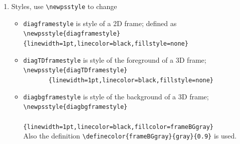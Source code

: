 \documentclass[12pt]{article}
\begin{document}
\begin{enumerate}
\begin{itemize}
       (default 1.5cm) see 
   \end{itemize}
\item Styles, use \verb+\newpsstyle+ to change
   \begin{itemize}
     \item \verb+diagframestyle+  
       is style of a 2D frame; defined as\\
       \verb+\newpsstyle{diagframestyle}{linewidth=1pt,linecolor=black,fillstyle=none}+
     \item \verb+diagTDframestyle+  
       is style of the foreground of a 3D frame;\\
       \verb+\newpsstyle{diagTDframestyle}+\\
       \verb+       {linewidth=1pt,linecolor=black,fillstyle=none}+
     \item \verb+diagbgframestyle+ 
       is style of the background of a 3D frame;\\
       \verb+\newpsstyle{diagbgframestyle}+\\
       \verb+           {linewidth=1pt,linecolor=black,fillcolor=frameBGgray}+\\
       Also the definition \verb+\definecolor{frameBGgray}{gray}{0.9}+
       is used.
   \end{itemize}
\end{enumerate}

\end{document}
